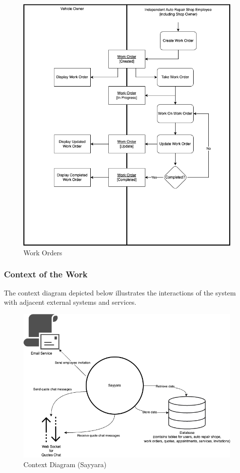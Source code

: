 \documentclass[12pt]{article}
\begin{document}
\FloatBarrier
\begin{figure}[!hbp]
	\centering
	\includegraphics[width=\linewidth/2]{./diagrams/WorkOrder.png}
	\caption{Work Orders}
\end{figure}
\FloatBarrier

\subsubsection{Context of the Work}
The context diagram depicted below illustrates the interactions of the system with adjacent
external systems and services.
\begin{figure}[!hbp]
	\centering
	\includegraphics[width=\linewidth/2]{./diagrams/ContextOfWork.png}
	\caption{Context Diagram (Sayyara)}
\end{figure}
\FloatBarrier
\end{document}
